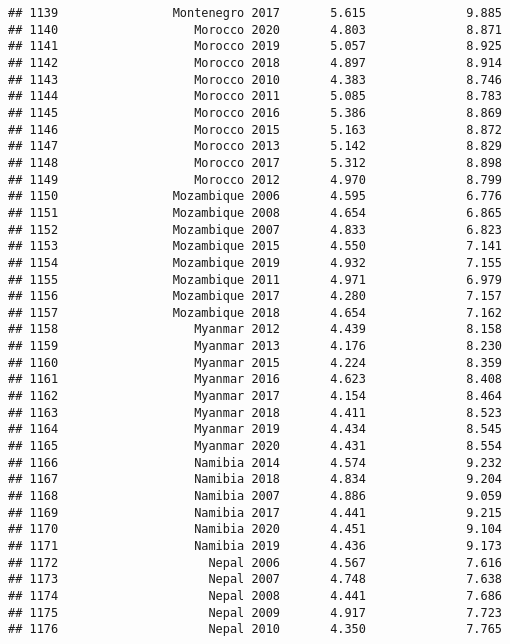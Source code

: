 \documentclass[
]{article}
\begin{document}
\begin{verbatim}
## 1139                Montenegro 2017       5.615              9.885
## 1140                   Morocco 2020       4.803              8.871
## 1141                   Morocco 2019       5.057              8.925
## 1142                   Morocco 2018       4.897              8.914
## 1143                   Morocco 2010       4.383              8.746
## 1144                   Morocco 2011       5.085              8.783
## 1145                   Morocco 2016       5.386              8.869
## 1146                   Morocco 2015       5.163              8.872
## 1147                   Morocco 2013       5.142              8.829
## 1148                   Morocco 2017       5.312              8.898
## 1149                   Morocco 2012       4.970              8.799
## 1150                Mozambique 2006       4.595              6.776
## 1151                Mozambique 2008       4.654              6.865
## 1152                Mozambique 2007       4.833              6.823
## 1153                Mozambique 2015       4.550              7.141
## 1154                Mozambique 2019       4.932              7.155
## 1155                Mozambique 2011       4.971              6.979
## 1156                Mozambique 2017       4.280              7.157
## 1157                Mozambique 2018       4.654              7.162
## 1158                   Myanmar 2012       4.439              8.158
## 1159                   Myanmar 2013       4.176              8.230
## 1160                   Myanmar 2015       4.224              8.359
## 1161                   Myanmar 2016       4.623              8.408
## 1162                   Myanmar 2017       4.154              8.464
## 1163                   Myanmar 2018       4.411              8.523
## 1164                   Myanmar 2019       4.434              8.545
## 1165                   Myanmar 2020       4.431              8.554
## 1166                   Namibia 2014       4.574              9.232
## 1167                   Namibia 2018       4.834              9.204
## 1168                   Namibia 2007       4.886              9.059
## 1169                   Namibia 2017       4.441              9.215
## 1170                   Namibia 2020       4.451              9.104
## 1171                   Namibia 2019       4.436              9.173
## 1172                     Nepal 2006       4.567              7.616
## 1173                     Nepal 2007       4.748              7.638
## 1174                     Nepal 2008       4.441              7.686
## 1175                     Nepal 2009       4.917              7.723
## 1176                     Nepal 2010       4.350              7.765

\end{verbatim}
\end{document}

